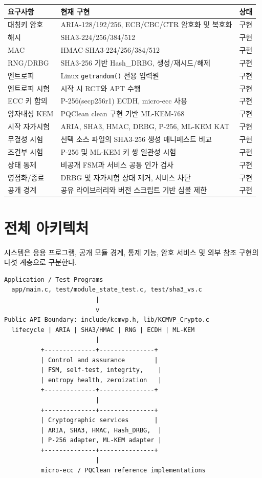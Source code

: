 \documentclass[11pt,a4paper]{article}
\begin{document}
\begin{longtable}{p{}p{}p{}}
\toprule
요구사항 & 현재 구현 & 상태 \\
\midrule
\endhead
대칭키 암호 & ARIA-128/192/256, ECB/CBC/CTR 암호화 및 복호화 & 구현 \\
해시 & SHA3-224/256/384/512 & 구현 \\
MAC & HMAC-SHA3-224/256/384/512 & 구현 \\
RNG/DRBG & SHA3-256 기반 Hash\_DRBG, 생성/재시드/해제 & 구현 \\
엔트로피 & Linux \texttt{getrandom()} 전용 입력원 & 구현 \\
엔트로피 시험 & 시작 시 RCT와 APT 수행 & 구현 \\
ECC 키 합의 & P-256(secp256r1) ECDH, micro-ecc 사용 & 구현 \\
양자내성 KEM & PQClean clean 구현 기반 ML-KEM-768 & 구현 \\
시작 자가시험 & ARIA, SHA3, HMAC, DRBG, P-256, ML-KEM KAT & 구현 \\
무결성 시험 & 선택 소스 파일의 SHA3-256 생성 매니페스트 비교 & 구현 \\
조건부 시험 & P-256 및 ML-KEM 키 쌍 일관성 시험 & 구현 \\
상태 통제 & 비공개 FSM과 서비스 공통 인가 검사 & 구현 \\
영점화/종료 & DRBG 및 자가시험 상태 제거, 서비스 차단 & 구현 \\
공개 경계 & 공유 라이브러리와 버전 스크립트 기반 심볼 제한 & 구현 \\
\bottomrule
\end{longtable}

\section{전체 아키텍처}

시스템은 응용 프로그램, 공개 모듈 경계, 통제 기능, 암호 서비스 및 외부 참조
구현의 다섯 계층으로 구분한다.

\begin{lstlisting}
Application / Test Programs
  app/main.c, test/module_state_test.c, test/sha3_vs.c
                         |
                         v
Public API Boundary: include/kcmvp.h, lib/KCMVP_Crypto.c
  lifecycle | ARIA | SHA3/HMAC | RNG | ECDH | ML-KEM
                         |
          +--------------+---------------+
          | Control and assurance        |
          | FSM, self-test, integrity,    |
          | entropy health, zeroization   |
          +--------------+---------------+
                         |
          +--------------+---------------+
          | Cryptographic services       |
          | ARIA, SHA3, HMAC, Hash_DRBG,  |
          | P-256 adapter, ML-KEM adapter |
          +--------------+---------------+
                         |
          micro-ecc / PQClean reference implementations
\end{lstlisting}
\end{document}
